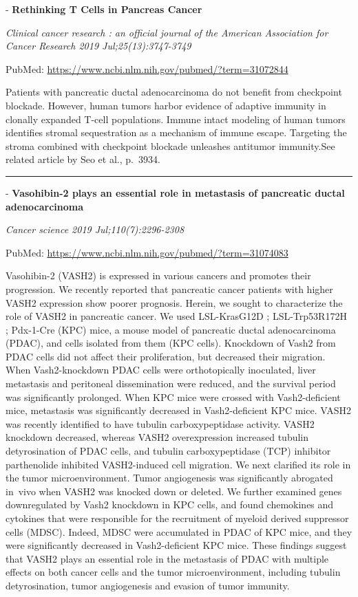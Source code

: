 \documentclass[]{article}
\begin{document}
 - \textbf{Rethinking T Cells in Pancreas Cancer}

\emph{Clinical cancer research : an official journal of the American
Association for Cancer Research 2019 Jul;25(13):3747-3749}

PubMed: \url{https://www.ncbi.nlm.nih.gov/pubmed/?term=31072844}

Patients with pancreatic ductal adenocarcinoma do not benefit from
checkpoint blockade. However, human tumors harbor evidence of adaptive
immunity in clonally expanded T-cell populations. Immune intact modeling
of human tumors identifies stromal sequestration as a mechanism of
immune escape. Targeting the stroma combined with checkpoint blockade
unleashes antitumor immunity.See related article by Seo et al., p.~3934.

{}

{}

\begin{center}\rule{0.5\linewidth}{\linethickness}\end{center}

 - \textbf{Vasohibin-2 plays an essential role in metastasis of
pancreatic ductal adenocarcinoma}

\emph{Cancer science 2019 Jul;110(7):2296-2308}

PubMed: \url{https://www.ncbi.nlm.nih.gov/pubmed/?term=31074083}

Vasohibin-2 (VASH2) is expressed in various cancers and promotes their
progression. We recently reported that pancreatic cancer patients with
higher VASH2 expression show poorer prognosis. Herein, we sought to
characterize the role of VASH2 in pancreatic cancer. We used
LSL-KrasG12D ; LSL-Trp53R172H ; Pdx-1-Cre (KPC) mice, a mouse model of
pancreatic ductal adenocarcinoma (PDAC), and cells isolated from them
(KPC cells). Knockdown of Vash2 from PDAC cells did not affect their
proliferation, but decreased their migration. When Vash2-knockdown PDAC
cells were orthotopically inoculated, liver metastasis and peritoneal
dissemination were reduced, and the survival period was significantly
prolonged. When KPC mice were crossed with Vash2-deficient mice,
metastasis was significantly decreased in Vash2-deficient KPC mice.
VASH2 was recently identified to have tubulin carboxypeptidase activity.
VASH2 knockdown decreased, whereas VASH2 overexpression increased
tubulin detyrosination of PDAC cells, and tubulin carboxypeptidase (TCP)
inhibitor parthenolide inhibited VASH2-induced cell migration. We next
clarified its role in the tumor microenvironment. Tumor angiogenesis was
significantly abrogated in~vivo when VASH2 was knocked down or deleted.
We further examined genes downregulated by Vash2 knockdown in KPC cells,
and found chemokines and cytokines that were responsible for the
recruitment of myeloid derived suppressor cells (MDSC). Indeed, MDSC
were accumulated in PDAC of KPC mice, and they were significantly
decreased in Vash2-deficient KPC mice. These findings suggest that VASH2
plays an essential role in the metastasis of PDAC with multiple effects
on both cancer cells and the tumor microenvironment, including tubulin
detyrosination, tumor angiogenesis and evasion of tumor immunity.
\end{document}
